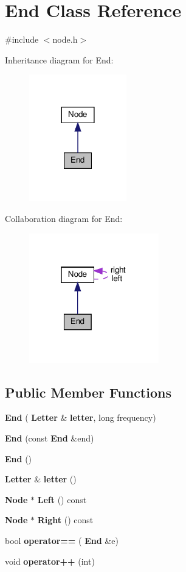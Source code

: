 \section{End Class Reference}
\label{class_end}


{\ttfamily \#include $<$node.\+h$>$}



Inheritance diagram for End\+:
\nopagebreak
\begin{figure}[H]
\begin{center}
\leavevmode
\includegraphics[width=120pt]{class_end__inherit__graph}
\end{center}
\end{figure}


Collaboration diagram for End\+:
\nopagebreak
\begin{figure}[H]
\begin{center}
\leavevmode
\includegraphics[width=160pt]{class_end__coll__graph}
\end{center}
\end{figure}
\subsection*{Public Member Functions}
\begin{DoxyCompactItemize}
\item 
\textbf{ End} (\textbf{ Letter} \&\textbf{ letter}, long frequency)
\item 
\textbf{ End} (const \textbf{ End} \&end)
\item 
\textbf{ End} ()
\item 
\textbf{ Letter} \& \textbf{ letter} ()
\item 
\textbf{ Node} $\ast$ \textbf{ Left} () const
\item 
\textbf{ Node} $\ast$ \textbf{ Right} () const
\item 
bool \textbf{ operator==} (\textbf{ End} \&e)
\item 
void \textbf{ operator++} (int)
\end{DoxyCompactItemize}
